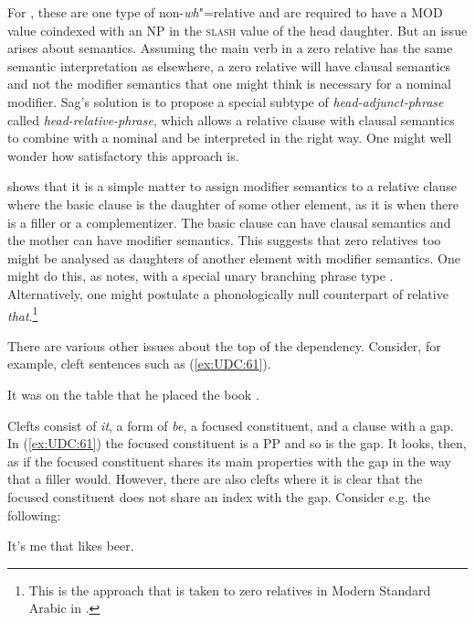 \documentclass[output=paper
                ,modfonts
                ,nonflat
	        ,collection
	        ,collectionchapter
	        ,collectiontoclongg
 	        ,biblatex
                ,babelshorthands
                ,newtxmath
                ,draftmode
                ,colorlinks, citecolor=brown
]{./langsci/langscibook}
\begin{document}
{\noindent
For \citet{Sag:97}, these are one type of non-\emph{wh}"=relative and are
required to have a MOD value coindexed with an NP in the \textsc{slash} value of
the head daughter. But an issue arises about semantics. Assuming the
main verb in a zero relative has the same semantic interpretation as
elsewhere, a zero relative will have clausal semantics and not the
modifier semantics that one might think is necessary for a nominal
modifier. Sag's solution is to propose a special subtype of
\emph{head-adjunct-phrase} called \emph{head-relative-phrase}, which
allows a relative clause with clausal semantics to combine with a
nominal and be interpreted in the right way. One might well wonder how
satisfactory this approach is.

\citet{Sag:10a} shows that it is a simple matter to assign modifier semantics
to a relative clause where the basic clause is the daughter of some
other element, as it is when there is a filler or a complementizer. The
basic clause can have clausal semantics and the mother can have modifier
semantics. This suggests that zero relatives too might be analysed as
daughters of another element with modifier semantics. One might do this,
as \citet[531]{Sag:10a} notes, with a special unary branching phrase
type \citep[sec.~10.3.2]{Mueller:99}.
Alternatively, one might postulate a phonologically null counterpart of
relative \emph{that}.\footnote{This is the approach that is taken to
  zero relatives in Modern Standard Arabic in \citet{Alqurashi:Borsley:12}.}

There are various other issues about the top of the dependency.
Consider, for example, cleft sentences such as (\ref{ex:UDC:61}).

\begin{exe}
\ex \label{ex:UDC:61}
 It was on the table that he placed the book \gap{}.
\end{exe}

\noindent
Clefts consist of \emph{it}, a form of \emph{be}, a focused constituent,
and a clause with a gap. In (\ref{ex:UDC:61}) the focused constituent is a PP and so
is the gap. It looks, then, as if the focused constituent shares its
main properties with the gap in the way that a filler would. However,
there are also clefts where it is clear that the focused constituent
does not share an index with the gap. Consider e.g. the following:

\begin{exe}
\ex \label{ex:UDC:62}
It's me that \gap{} likes beer.
\end{exe}

}
\end{document}
